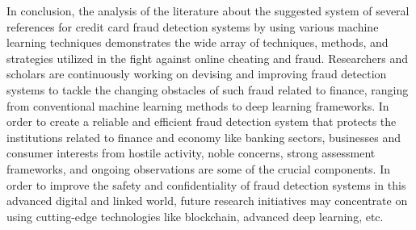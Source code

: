 In conclusion, the analysis of the literature about the suggested system of several references
for credit card fraud detection systems by using various machine learning techniques
demonstrates the wide array of techniques, methods, and strategies utilized in the fight against online cheating and fraud. Researchers and scholars are continuously working on devising and
improving fraud detection systems to tackle the changing obstacles of such fraud related to
finance, ranging from conventional machine learning methods to deep learning frameworks. In
order to create a reliable and efficient fraud detection system that protects the institutions
related to finance and economy like banking sectors, businesses and consumer interests from
hostile activity, noble concerns, strong assessment frameworks, and ongoing observations are
some of the crucial components. In order to improve the safety and confidentiality of fraud
detection systems in this advanced digital and linked world, future research initiatives may
concentrate on using cutting-edge technologies like blockchain, advanced deep learning, etc.




